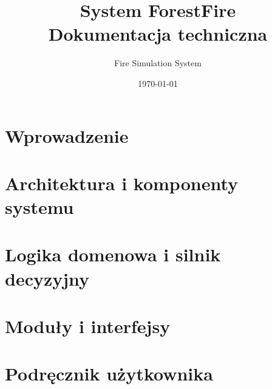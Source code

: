 \documentclass[11pt,a4paper]{report}
\title{System ForestFire \\ \large Dokumentacja techniczna}
\author{Fire Simulation System}
\date{\today}
\begin{document}
\maketitle
\tableofcontents

\chapter{Wprowadzenie}


\chapter{Architektura i komponenty systemu}


\chapter{Logika domenowa i silnik decyzyjny}


\chapter{Moduły i interfejsy}


\chapter{Podręcznik użytkownika}

\end{document}
